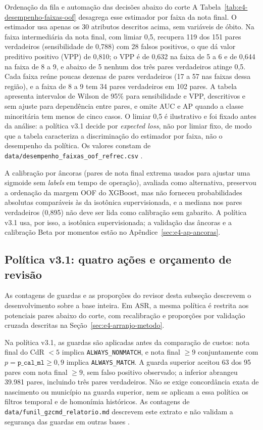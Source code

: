 \begin{chapter}{Ordenação da fila e automação das decisões abaixo do corte}
A Tabela~\ref{tab:e4-desempenho-faixas-oof} desagrega esse estimador por faixa da nota final. O estimador usa apenas os 30 atributos descritos acima, sem variáveis de óbito. Na faixa intermediária da nota final, com limiar 0,5, recupera 119 dos 151 pares verdadeiros (sensibilidade de 0,788) com 28 falsos positivos, o que dá valor preditivo positivo (VPP) de 0,810; o VPP é de 0,632 na faixa de 5 a 6 e de 0,644 na faixa de 8 a 9, e abaixo de 5 nenhum dos três pares verdadeiros atinge 0,5. Cada faixa reúne poucas dezenas de pares verdadeiros (17 a 57 nas faixas dessa região), e a faixa de 8 a 9 tem 34 pares verdadeiros em 102 pares. A tabela apresenta intervalos de Wilson de 95\% para sensibilidade e VPP, descritivos e sem ajuste para dependência entre pares, e omite AUC e AP quando a classe minoritária tem menos de cinco casos. O limiar 0,5 é ilustrativo e foi fixado antes da análise: a política v3.1 decide por \textit{expected loss}, não por limiar fixo, de modo que a tabela caracteriza a discriminação do estimador por faixa, não o desempenho da política. Os valores constam de \texttt{data/desempenho\_faixas\_oof\_refrec.csv} \cite{Jardim2026phdrepo}.



A calibração por âncoras (pares de nota final extrema usados para ajustar uma sigmoide sem \textit{labels} em tempo de operação), avaliada como alternativa, preservou a ordenação da margem OOF do XGBoost, mas não forneceu probabilidades absolutas comparáveis às da isotônica supervisionada, e a mediana nos pares verdadeiros (0,895) não deve ser lida como calibração sem gabarito. A política v3.1 usa, por isso, a isotônica supervisionada; a validação das âncoras e a calibração Beta por momentos estão no Apêndice~\ref{sec:e4-ap-ancoras}.

\subsection{Política v3.1: quatro ações e orçamento de revisão}
\label{sec:e4-politica-v31}

As contagens de guardas e as proporções do revisor desta subseção descrevem o desenvolvimento sobre a base inteira. Em ASR, a mesma política é restrita aos potenciais pares abaixo do corte, com recalibração e proporções por validação cruzada descritas na Seção~\ref{sec:e4-arranjo-metodo}.

Na política v3.1, as guardas são aplicadas antes da comparação de custos: nota final do CdR $<5$ implica \texttt{ALWAYS\_NONMATCH}, e nota final $\geq9$ conjuntamente com $p=\texttt{p\_cal\_ml}\geq0{,}9$ implica \texttt{ALWAYS\_MATCH}. A guarda superior aceitou 63 dos 95 pares com nota final $\geq9$, sem falso positivo observado; a inferior abrangeu 39.981 pares, incluindo três pares verdadeiros. Não se exige concordância exata de nascimento ou município na guarda superior, nem se aplicam a essa política os filtros temporal e de homonímia históricos. As contagens de \texttt{data/funil\_gzcmd\_relatorio.md} descrevem este extrato e não validam a segurança das guardas em outras bases \cite{Jardim2026phdrepo}.


\end{chapter}
